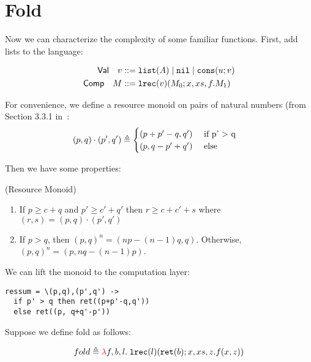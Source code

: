 \section{Fold}

Now we can characterize the complexity of some familiar functions. 
First, add lists to the language: 

\begin{align*}
    \mathsf{Val} \quad v &::= \listty{A}
    \mid \nil
    \mid \cons{u}{v}\\
    \mathsf{Comp} \quad M &::= \lrec{v}{M_0}{x,xs,f}{M_1}
\end{align*}

\begin{mathpar}


\end{mathpar}

For convenience, we define a resource monoid on pairs of natural numbers (from 
Section 3.3.1 in~\cite{Hoffmann11}: 
\[
(p,q) \cdot (p',q') \triangleq \begin{cases}
(p + p' - q, q') \quad\text{ if } $p' > q$\\
(p, q - p' + q') \quad\text{ else }
\end{cases}
\]

Then we have some properties:

\begin{lemma}(Resource Monoid)
\begin{enumerate}
\item If $p \ge c + q$ and $p' \ge c' + q'$ then $r \ge c+c' + s$ where 
$(r,s) = (p,q) \cdot (p',q')$
\item If $p > q$, then $(p,q)^n = (np - (n-1)q, q)$. Otherwise, 
$(p,q)^n = (p, nq - (n-1)p)$. 
\end{enumerate}
\end{lemma}

We can lift the monoid to the computation layer:

\begin{verbatim}
ressum = \(p,q),(p',q') ->
  if p' > q then ret((p+p'-q,q'))
  else ret((p, q+q'-p'))
\end{verbatim}

Suppose we define fold as follows:

\[
fold \triangleq \lam{f,b,l}{}{\lrec{l}{\ret{b}}{x,xs,z}{f(x,z)}}
\]

